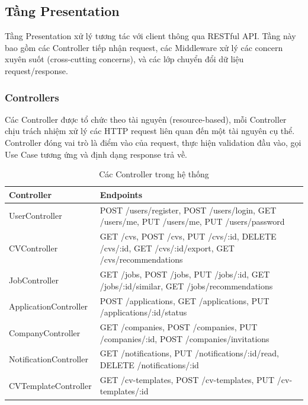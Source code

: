 \subsection{Tầng Presentation}
\label{subsec:presentation-layer-design}

Tầng Presentation xử lý tương tác với client thông qua RESTful API. Tầng này bao gồm các Controller tiếp nhận request, các Middleware xử lý các concern xuyên suốt (cross-cutting concerns), và các lớp chuyển đổi dữ liệu request/response.

\subsubsection{Controllers}

Các Controller được tổ chức theo tài nguyên (resource-based), mỗi Controller chịu trách nhiệm xử lý các HTTP request liên quan đến một tài nguyên cụ thể. Controller đóng vai trò là điểm vào của request, thực hiện validation đầu vào, gọi Use Case tương ứng và định dạng response trả về.

\begin{table}[H]
\centering
\caption{Các Controller trong hệ thống}
\label{tab:controllers}
\begin{tabular}{|p{3.5cm}|p{8.5cm}|}
\hline
\textbf{Controller} & \textbf{Endpoints} \\
\hline
UserController & POST /users/register, POST /users/login, GET /users/me, PUT /users/me, PUT /users/password \\
\hline
CVController & GET /cvs, POST /cvs, PUT /cvs/:id, DELETE /cvs/:id, GET /cvs/:id/export, GET /cvs/recommendations \\
\hline
JobController & GET /jobs, POST /jobs, PUT /jobs/:id, GET /jobs/:id/similar, GET /jobs/recommendations \\
\hline
ApplicationController & POST /applications, GET /applications, PUT /applications/:id/status \\
\hline
CompanyController & GET /companies, POST /companies, PUT /companies/:id, POST /companies/invitations \\
\hline
NotificationController & GET /notifications, PUT /notifications/:id/read, DELETE /notifications/:id \\
\hline
CVTemplateController & GET /cv-templates, POST /cv-templates, PUT /cv-templates/:id \\
\hline
\end{tabular}
\end{table}

